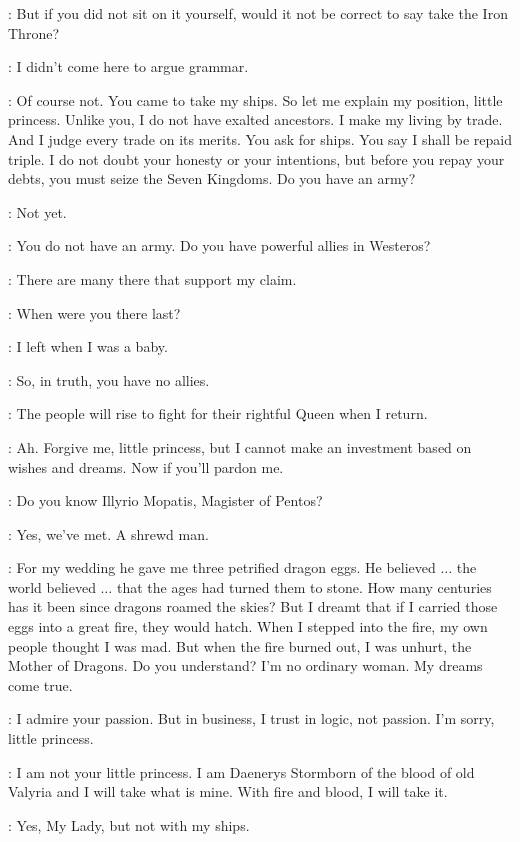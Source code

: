 \SPICEKING: But if you did not sit on it yourself, would it not be correct to say take the Iron Throne? 

\DAENERYS: I didn't come here to argue grammar. 

\SPICEKING: Of course not. You came to take my ships. So let me explain my position, little princess. Unlike you, I do not have exalted ancestors. I make my living by trade. And I judge every trade on its merits. You ask for ships. You say I shall be repaid triple. I do not doubt your honesty or your intentions, but before you repay your debts, you must seize the Seven Kingdoms. Do you have an army? 

\DAENERYS: Not yet. 

\SPICEKING: You do not have an army. Do you have powerful allies in Westeros? 

\DAENERYS: There are many there that support my claim. 

\SPICEKING: When were you there last? 

\DAENERYS: I left when I was a baby. 

\SPICEKING: So, in truth, you have no allies. 

\DAENERYS: The people will rise to fight for their rightful Queen when I return. 

\SPICEKING: Ah. Forgive me, little princess, but I cannot make an investment based on wishes and dreams. Now if you'll pardon me. 

\DAENERYS: Do you know Illyrio Mopatis, Magister of Pentos? 

\SPICEKING: Yes, we've met. A shrewd man. 

\DAENERYS: For my wedding he gave me three petrified dragon eggs. He believed $\ldots$ the world believed $\ldots$ that the ages had turned them to stone. How many centuries has it been since dragons roamed the skies? But I dreamt that if I carried those eggs into a great fire, they would hatch. When I stepped into the fire, my own people thought I was mad. But when the fire burned out, I was unhurt, the Mother of Dragons. Do you understand? I'm no ordinary woman. My dreams come true. 

\SPICEKING: I admire your passion. But in business, I trust in logic, not passion. I'm sorry, little princess. 

\DAENERYS: I am not your little princess. I am Daenerys Stormborn of the blood of old Valyria and I will take what is mine. With fire and blood, I will take it. 

\SPICEKING:  Yes, My Lady, but not with my ships. 


